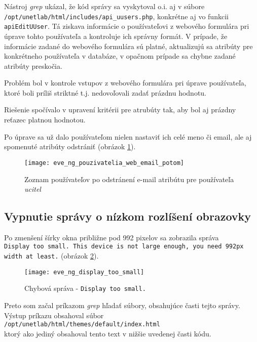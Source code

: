 Nástroj \emph{grep} ukázal, že kód správy sa vyskytoval o.i. aj v súbore \\
\texttt{/opt/unetlab/html/includes/api\_uusers.php}, konkrétne aj vo funkcii \texttt{apiEditUUser}. Tá ziskava informácie o používateľovi z webového formulára pri úprave tohto používateľa a kontroluje ich správny formát. V prípade, že informácie zadané do webového formulára sú platné, aktualizujú sa atribúty pre konkrétneho používateľa v databáze, v opačnom prípade sa chybne zadané atribúty preskočia.

Problém bol v kontrole vstupov z webového formulára pri úprave používateľa, ktoré boli príliš striktné t.j. nedovoľovali zadať prázdnu hodnotu.

Riešenie spočívalo v upravení kritérii pre atrubúty tak, aby bol aj prázdny reťazec platnou hodnotou.

Po úprave sa už dalo používateľom nielen nastaviť ich celé meno či email, ale aj spomenuté atribúty odstrániť (obrázok \ref{obr:eve_ng_pouzivatelia_web_email_potom}).

\begin{figure}
    \centering
    \texttt{[image: eve\_ng\_pouzivatelia\_web\_email\_potom]}
    \caption{Zoznam používateľov po odstránení e-mail atribútu pre používateľa \emph{ucitel}}
    \label{obr:eve_ng_pouzivatelia_web_email_potom}
\end{figure}




\subsection{Vypnutie správy o nízkom rozlíšení obrazovky}

Po zmenšení šírky okna približne pod 992 pixelov sa zobrazila správa \\
\texttt{Display too small. This device is not large enough, you need 992px width at least.} (obrázok \ref{obr:eve_ng_display_too_small}).

\begin{figure}
    \centering
    \texttt{[image: eve\_ng\_display\_too\_small]}
    \caption{Chybová správa - \texttt{Display too small.}}
    \label{obr:eve_ng_display_too_small}
\end{figure}

Preto som začal príkazom \emph{grep} hľadať súbory, obsahujúce časti tejto správy. Výstup príkazu obsahoval súbor \\ \texttt{/opt/unetlab/html/themes/default/index.html} \\
ktorý ako jediný obsahoval tento text v nižšie uvedenej časti kódu.

